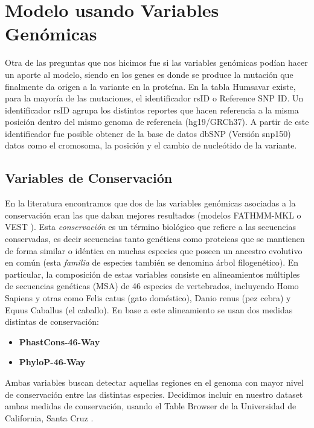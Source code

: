 \section{Modelo usando Variables Genómicas}

Otra de las preguntas que nos hicimos fue si las variables genómicas podían hacer un aporte al modelo, siendo en los genes es donde se produce la mutación que finalmente da origen a la variante en la proteína. En la tabla Humsavar existe, para la mayoría de las mutaciones, el identificador rsID o Reference SNP ID. Un identificador rsID agrupa los distintos reportes que hacen referencia a la misma posición dentro del mismo genoma de referencia (hg19/GRCh37). A partir de este identificador fue posible obtener de la base de datos dbSNP (Versión snp150) datos como el cromosoma, la posición y el cambio de nucleótido de la variante. 

\subsection{Variables de Conservación}

En la literatura encontramos que dos de las variables genómicas asociadas a la conservación eran las que daban mejores resultados (modelos FATHMM-MKL \cite{Shihab2015} o VEST \cite{Carter2013}). Esta \textit{conservación} es un término biológico que refiere a las secuencias conservadas, es decir secuencias tanto genéticas como proteicas que se mantienen de forma similar o idéntica en muchas especies que poseen un ancestro evolutivo en común (esta \textit{familia} de especies también se denomina árbol filogenético). En particular, la composición de estas variables consiste en alineamientos múltiples de secuencias genéticas (MSA) de 46 especies de vertebrados, incluyendo Homo Sapiens y otras como Felis catus (gato doméstico), Danio renus (pez cebra) y Equus Caballus (el caballo). En base a este alineamiento se usan dos medidas distintas de conservación:
\begin{itemize}
    \item \textbf{PhastCons-46-Way} \cite{siepel2005evolutionarily}
    \item \textbf{PhyloP-46-Way} \cite{Pollard2010}
\end{itemize}
Ambas variables buscan detectar aquellas regiones en el genoma con mayor nivel de conservación entre las distintas especies. Decidimos incluir en nuestro dataset ambas medidas de conservación, usando el Table Browser de la Universidad de California, Santa Cruz \cite{Karolchik2004}.

